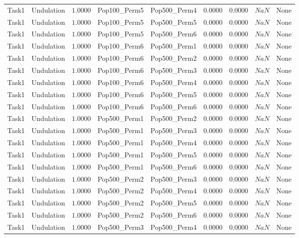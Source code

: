 \documentclass[8pt]{article}
\begin{document}
\begin{longtable}{llccccccc}
Task1 & Undulation & $1.0000$ & Pop100\_Perm5 & Pop500\_Perm4 & 0.0000 & 0.0000 & $NaN$ & None \\
Task1 & Undulation & $1.0000$ & Pop100\_Perm5 & Pop500\_Perm5 & 0.0000 & 0.0000 & $NaN$ & None \\
Task1 & Undulation & $1.0000$ & Pop100\_Perm5 & Pop500\_Perm6 & 0.0000 & 0.0000 & $NaN$ & None \\
Task1 & Undulation & $1.0000$ & Pop100\_Perm6 & Pop500\_Perm1 & 0.0000 & 0.0000 & $NaN$ & None \\
Task1 & Undulation & $1.0000$ & Pop100\_Perm6 & Pop500\_Perm2 & 0.0000 & 0.0000 & $NaN$ & None \\
Task1 & Undulation & $1.0000$ & Pop100\_Perm6 & Pop500\_Perm3 & 0.0000 & 0.0000 & $NaN$ & None \\
Task1 & Undulation & $1.0000$ & Pop100\_Perm6 & Pop500\_Perm4 & 0.0000 & 0.0000 & $NaN$ & None \\
Task1 & Undulation & $1.0000$ & Pop100\_Perm6 & Pop500\_Perm5 & 0.0000 & 0.0000 & $NaN$ & None \\
Task1 & Undulation & $1.0000$ & Pop100\_Perm6 & Pop500\_Perm6 & 0.0000 & 0.0000 & $NaN$ & None \\
Task1 & Undulation & $1.0000$ & Pop500\_Perm1 & Pop500\_Perm2 & 0.0000 & 0.0000 & $NaN$ & None \\
Task1 & Undulation & $1.0000$ & Pop500\_Perm1 & Pop500\_Perm3 & 0.0000 & 0.0000 & $NaN$ & None \\
Task1 & Undulation & $1.0000$ & Pop500\_Perm1 & Pop500\_Perm4 & 0.0000 & 0.0000 & $NaN$ & None \\
Task1 & Undulation & $1.0000$ & Pop500\_Perm1 & Pop500\_Perm5 & 0.0000 & 0.0000 & $NaN$ & None \\
Task1 & Undulation & $1.0000$ & Pop500\_Perm1 & Pop500\_Perm6 & 0.0000 & 0.0000 & $NaN$ & None \\
Task1 & Undulation & $1.0000$ & Pop500\_Perm2 & Pop500\_Perm3 & 0.0000 & 0.0000 & $NaN$ & None \\
Task1 & Undulation & $1.0000$ & Pop500\_Perm2 & Pop500\_Perm4 & 0.0000 & 0.0000 & $NaN$ & None \\
Task1 & Undulation & $1.0000$ & Pop500\_Perm2 & Pop500\_Perm5 & 0.0000 & 0.0000 & $NaN$ & None \\
Task1 & Undulation & $1.0000$ & Pop500\_Perm2 & Pop500\_Perm6 & 0.0000 & 0.0000 & $NaN$ & None \\
Task1 & Undulation & $1.0000$ & Pop500\_Perm3 & Pop500\_Perm4 & 0.0000 & 0.0000 & $NaN$ & None \\

\end{longtable}
\end{document}
